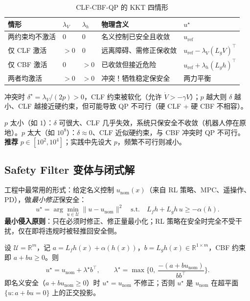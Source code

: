 \begin{table}[H]\centering\small
\caption{CLF-CBF-QP 的 KKT 四情形}
\label{tab:kkt-cases}
\begin{tabular}{lllll}
\toprule
情形 & $\lambda_V$ & $\lambda_h$ & 物理含义 & $u^\star$ \\
\midrule
两约束均不激活 & $0$ & $0$ & 名义控制已安全且收敛 & $u_{\mathrm{ref}}$ \\
仅 CLF 激活 & $>0$ & $0$ & 远离障碍、需修正保收敛 & $u_{\mathrm{ref}}-\lambda_V(L_gV)^\top$ \\
仅 CBF 激活 & $0$ & $>0$ & 已收敛但接近危险 & $u_{\mathrm{ref}}+\lambda_h(L_gh)^\top$ \\
两者均激活 & $>0$ & $>0$ & 冲突！牺牲稳定保安全 & 两力平衡 \\
\bottomrule
\end{tabular}
\end{table}

冲突时 $\delta^\star=\lambda_V/(2p)>0$，CLF 约束被软化（允许 $\dot V>-\gamma V$）；$p$ 越大则 $\delta$ 越小、CLF 越接近硬约束，但可能导致 QP 不可行（硬 CLF + 硬 CBF 不相容）。

\begin{pitfall}
$p$ 太小（如 $1$）：$\delta$ 可很大、CLF 几乎失效，系统只保安全不收敛（机器人停在原地）。$p$ 太大（如 $10^8$）：$\delta\approx0$、CLF 近似硬约束，与 CBF 冲突时 QP 不可行。\textbf{推荐} $p\in[10^2,10^4]$；实践中先设大 $p$，频繁不可行则减小。
\end{pitfall}

\subsection{Safety Filter 变体与闭式解}
\label{sec:cbf-qp-filter}

工程中最常用的形式：给定名义控制 $u_{\mathrm{nom}}(x)$（来自 RL 策略、MPC、遥操作、PD），做\emph{最小修正}保安全：
\begin{equation}
u^\star=\arg\min_{u\in\mathcal U}\|u-u_{\mathrm{nom}}\|^2\quad\text{s.t.}\quad L_fh+L_gh\,u\ge-\alpha(h).
\label{eq:safety-filter}
\end{equation}
\textbf{最小侵入原则}：只在必须时修正、修正量最小化；RL 策略在安全时完全不受干扰，仅在即将违规时被轻推回安全侧。

\begin{theorem}\label{thm:filter-closed}
设 $\mathcal U=\mathbb R^m$，记 $a=L_fh(x)+\alpha(h(x))$，$b=L_gh(x)\in\mathbb R^{1\times m}$，CBF 约束即 $a+bu\ge0$。则
\begin{equation}
u^\star=u_{\mathrm{nom}}+\lambda^\star b^\top,\qquad \lambda^\star=\max\Big\{0,\ \frac{-(a+bu_{\mathrm{nom}})}{bb^\top}\Big\}.
\label{eq:filter-closed}
\end{equation}
即名义安全（$a+bu_{\mathrm{nom}}\ge0$）时 $u^\star=u_{\mathrm{nom}}$ 不修正；否则 $u^\star$ 是 $u_{\mathrm{nom}}$ 在超平面 $\{u:a+bu=0\}$ 上的正交投影。
\end{theorem}

